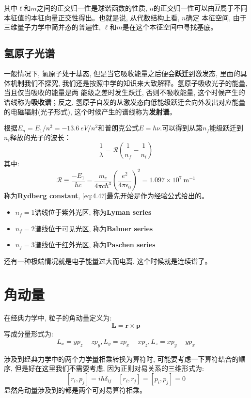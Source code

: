 \documentclass[a4paper,zihao=-4,linespread=1]{ctexrep}
\begin{document}
    其中$\ell$和$m$之间的正交归一性是球谐函数的性质, $n$的正交归一性可以由$\hat{H}$属于不同本征值的本征向量正交性得出。也就是说, 从代数结构上看, $n$确定
    本征空间, 由于三维量子力学中简并态的普遍性, $\ell$和$m$是在这个本征空间中寻找基底。
    \subsection{氢原子光谱}
    一般情况下, 氢原子处于基态, 但是当它吸收能量之后便会\textbf{跃迁}到激发态, 里面的具体机制我们不探究, 我们还是按照中学的知识来大致解释。氢原子吸收光子的能量, 当且仅当吸收的能量是两
    能级之差时发生跃迁, 否则不吸收能量, 这个时候产生的谱线称为\textbf{吸收谱}；反之, 氢原子自发的从激发态向低能级跃迁会向外发出对应能量的电磁辐射(光子形式), 这个时候产生的谱线称为\textbf{发射谱}。
    
    根据$E_n=E_1/n^2=-\SI{13.6}{eV}/{n^2}$和普朗克公式$E=h\nu$.可以得到从第$n_f$能级跃迁到$n_i$释放的光子的波长：
    \begin{equation}
        \label{eq:4.47}
        \frac{1}{\lambda}=\mathcal{R}\left(\frac{1}{n_f}-\frac{1}{n_i}\right)     
    \end{equation}
    其中:
    \[\mathcal{R} \equiv \frac{-E_1}{hc} = \frac{m_{e}}{4 \pi c \hbar^{3}}\left(\frac{e^{2}}{4 \pi \epsilon_{0}}\right)^{2}=1.097 \times 10^{7} \mathrm{~m}^{-1}\]
    称为\textbf{Rydberg constant}, \ref{eq:4.47}最先开始是作为经验公式给出的。
    \begin{itemize}
        \item $n_f=1$\quad 谱线位于紫外光区, 称为\textbf{Lyman series}
        \item $n_f=2$\quad 谱线位于可见光区, 称为\textbf{Balmer series}
        \item $n_f=3$\quad 谱线位于红外光区, 称为\textbf{Paschen series}
    \end{itemize}

    还有一种极端情况就是电子能量过大而电离, 这个时候就是连续谱了。

    \section{角动量}
    在经典力学中, 粒子的角动量定义为:\[\bm{L}=\bm{r}\times\bm{p}\]写成分量形式为:\[L_x=yp_z-zp_y,L_y=zp_x-xp_z,L_z=xp_y-yp_x\]
    
    涉及到经典力学中的两个力学量相乘转换为算符时, 可能要考虑一下算符结合的顺序, 但是好在这里我们不需要考虑, 因为正则对易关系的三维形式为:
    \begin{equation}
        \label{eq:4.48*}
        \boxed{
        \left[r_i,p_j\right]=i\hbar\delta_{ij}\quad\left[r_i,r_j\right]=\left[p_i,p_j\right]=0
        }
    \end{equation}
    显然角动量涉及到的都是两个可对易算符相乘。
    
\end{document}
